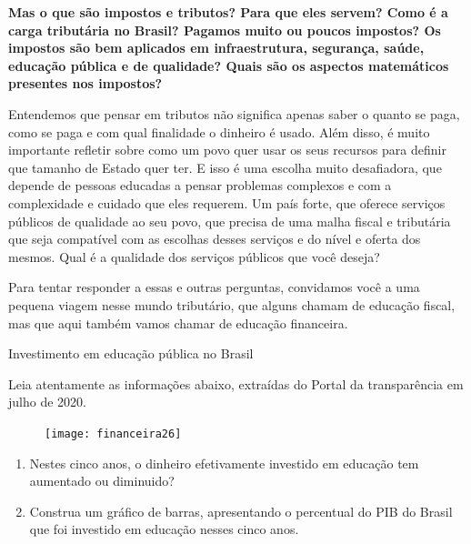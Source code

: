 \textbf{Mas o que são impostos e tributos? Para que eles servem? Como é a carga tributária no Brasil? Pagamos muito ou poucos impostos? Os impostos são bem aplicados em infraestrutura, segurança, saúde, educação pública e de qualidade? Quais são os aspectos matemáticos presentes nos impostos?}

Entendemos que pensar em tributos não significa apenas saber o quanto se paga, como se paga e com qual finalidade o dinheiro é usado. Além disso, é muito importante refletir sobre como um povo quer usar os seus recursos para definir que tamanho de Estado quer ter. E isso é uma escolha muito desafiadora, que depende de pessoas educadas a pensar problemas complexos e com a complexidade e cuidado que eles requerem. Um país forte, que oferece serviços públicos de qualidade ao seu povo, que precisa de uma malha fiscal e tributária que seja compatível com as escolhas desses serviços e do nível e oferta dos mesmos. Qual é a qualidade dos serviços públicos que você deseja?

Para tentar responder a essas e outras perguntas, convidamos você a uma pequena viagem nesse mundo tributário, que alguns chamam de educação fiscal, mas que aqui também vamos chamar de educação financeira.

\begin{task}{Investimento em educação pública no Brasil}

Leia atentamente as informações abaixo, extraídas do Portal da transparência em julho de 2020.

\begin{figure}[H]
\centering

\texttt{[image: financeira26]}
\end{figure}

\begin{enumerate}
  \item Nestes cinco anos, o dinheiro efetivamente investido em educação tem aumentado ou diminuido?
  \item Construa um gráfico de barras, apresentando o percentual do PIB do Brasil que foi investido em educação nesses cinco anos.
\end{enumerate}

\end{task}

